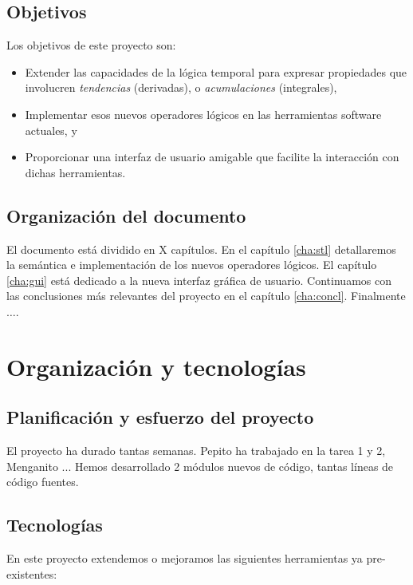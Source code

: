 \section{Objetivos}

Los objetivos de este proyecto son:

\begin{itemize}
\item Extender las capacidades de la lógica temporal para expresar propiedades que involucren \textit{tendencias} (derivadas), o \textit{acumulaciones} (integrales), 
\item Implementar esos nuevos operadores lógicos en las herramientas software actuales, y
\item Proporcionar una interfaz de usuario amigable que facilite la interacción con dichas herramientas.
\end{itemize}

\section{Organización del documento}

El documento está dividido en X capítulos. En el capítulo \ref{cha:stl} detallaremos la semántica e implementación de los nuevos operadores lógicos. El capítulo \ref{cha:gui} está dedicado a la nueva interfaz gráfica de usuario. Continuamos con las conclusiones más relevantes del proyecto en el capítulo \ref{cha:concl}. Finalmente $\ldots$.

\chapter{Organización y tecnologías}
\section{Planificación y esfuerzo del proyecto}
El proyecto ha durado tantas semanas. Pepito ha trabajado en la tarea 1 y 2, Menganito ...
Hemos desarrollado 2 módulos nuevos de código, tantas líneas de código fuentes.

\section{Tecnologías}
En este proyecto extendemos o mejoramos las siguientes herramientas ya pre-existentes:

